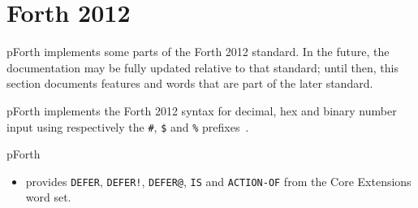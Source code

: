 \documentclass[english]{article}
\begin{document}
\section{Forth 2012}
\label{forth2012}

pForth implements some parts of the Forth 2012 standard. In the future, the documentation may be fully updated relative to that standard; until then, this section documents features and words that are part of the later standard.

pForth implements the Forth 2012 syntax for decimal, hex and binary number input using respectively the {\tt \#}, {\tt \$} and {\tt \%} prefixes~\cite[section 3.4.1.3 “Text interpreter input number conversion”]{forth2012}.

pForth
\vspace{-3mm}
\begin{itemize}
\item[]provides {\tt DEFER}, {\tt DEFER!}, {\tt DEFER@}, {\tt IS} and {\tt ACTION-OF} from the Core Extensions word set.
\end{itemize}




\end{document}
